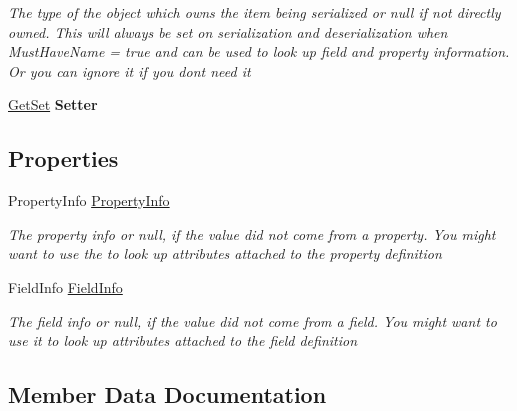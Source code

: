 \begin{DoxyCompactItemize}
\begin{DoxyCompactList}\small\item\em The type of the object which owns the item being serialized or null if not directly owned. This will always be set on serialization and deserialization when Must\+Have\+Name = true and can be used to look up field and property information. Or you can ignore it if you don\textquotesingle{}t need it \end{DoxyCompactList}\item 
\mbox{\label{class_serialization_1_1_entry_a7f497ef992f38fceb6c4aea8643a7caf}} 
\hyperlink{class_serialization_1_1_get_set}{Get\+Set} {\bfseries Setter}
\end{DoxyCompactItemize}
\subsection*{Properties}
\begin{DoxyCompactItemize}
\item 
Property\+Info \hyperlink{class_serialization_1_1_entry_a079414059819b92c873921247bc0686b}{Property\+Info}
\begin{DoxyCompactList}\small\item\em The property info or null, if the value did not come from a property. You might want to use the to look up attributes attached to the property definition \end{DoxyCompactList}\item 
Field\+Info \hyperlink{class_serialization_1_1_entry_ac9c4d67292047b6a3f9a3d3fcdccb09e}{Field\+Info}
\begin{DoxyCompactList}\small\item\em The field info or null, if the value did not come from a field. You might want to use it to look up attributes attached to the field definition \end{DoxyCompactList}\end{DoxyCompactItemize}


\subsection{Member Data Documentation}
\mbox{\label{class_serialization_1_1_entry_aa2f98ee039ca25cefe57774a76903556}} 
